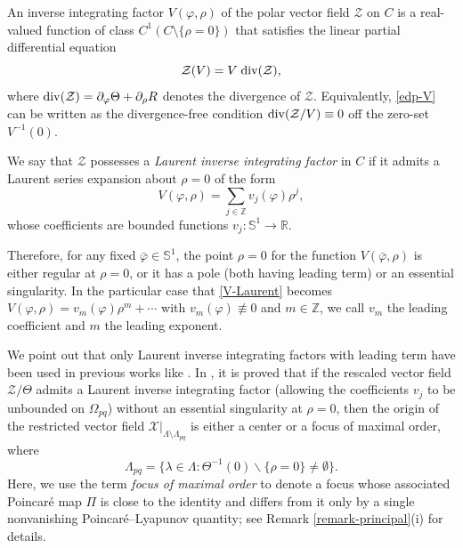 \documentclass[12pt]{amsart}
\begin{document}
An inverse integrating factor $V(\varphi, \rho)$ of the polar vector field $\mathcal{Z}$ on $C$ is a real-valued function of class $C^1(C \setminus \{\rho=0 \})$ that satisfies the linear partial differential equation
\begin{equation}\label{edp-V}
\mathcal{Z}(V) = V \; {\rm div}(\mathcal{Z}),
\end{equation}
where ${\rm div}(\mathcal{Z}) = \partial_\varphi \Theta + \partial_\rho R$ denotes the divergence of $\mathcal{Z}$. Equivalently, \eqref{edp-V} can be written as the divergence-free condition ${\rm div}(\mathcal{Z}/V) \equiv 0$ off the zero-set $V^{-1}(0)$.

We say that $\mathcal{Z}$ possesses a {\it Laurent inverse integrating factor} in $C$ if it admits a Laurent series expansion about $\rho=0$ of the form
\begin{equation}\label{V-Laurent}
V(\varphi, \rho) = \sum_{j \in \mathbb{Z}} v_j(\varphi) \rho^{j},
\end{equation}
whose coefficients are bounded functions $v_j : \mathbb{S}^1 \to \mathbb{R}$.

Therefore, for any fixed $\bar{\varphi} \in \mathbb{S}^1$, the point $\rho=0$ for the function $V(\bar{\varphi}, \rho)$ is either regular at $\rho=0$, or it has a pole (both having leading term) or an essential singularity. In the particular case that \eqref{V-Laurent} becomes $V(\varphi, \rho) = v_m(\varphi) \rho^{m} + \cdots$ with $v_m(\varphi) \not\equiv 0$ and $m \in \mathbb{Z}$, we call $v_m$ the leading coefficient and $m$ the leading exponent.

We point out that only Laurent inverse integrating factors with leading term have been used in previous works like \cite{GaGi2, GaGi4, Ga-Ma}. In \cite{GaGi4}, it is proved that if the rescaled vector field $\mathcal{Z}/\Theta$ admits a Laurent inverse integrating factor (allowing the coefficients $v_j$ to be unbounded on $\Omega_{pq}$) without an essential singularity at $\rho=0$, then the origin of the restricted vector field $\mathcal{X}|_{\Lambda \setminus \Lambda_{pq}}$ is either a center or a focus of maximal order, where
\begin{equation}\label{L-pq}
\Lambda_{pq} = \{ \lambda \in \Lambda : \Theta^{-1}(0) \backslash \{ \rho = 0 \} \neq \emptyset \}.
\end{equation}
Here, we use the term {\it focus of maximal order} to denote a focus whose associated Poincar\'e map $\Pi$ is close to the identity and differs from it only by a single nonvanishing Poincar\'e--Lyapunov quantity; see Remark \ref{remark-principal}(i) for details.
\end{document}

